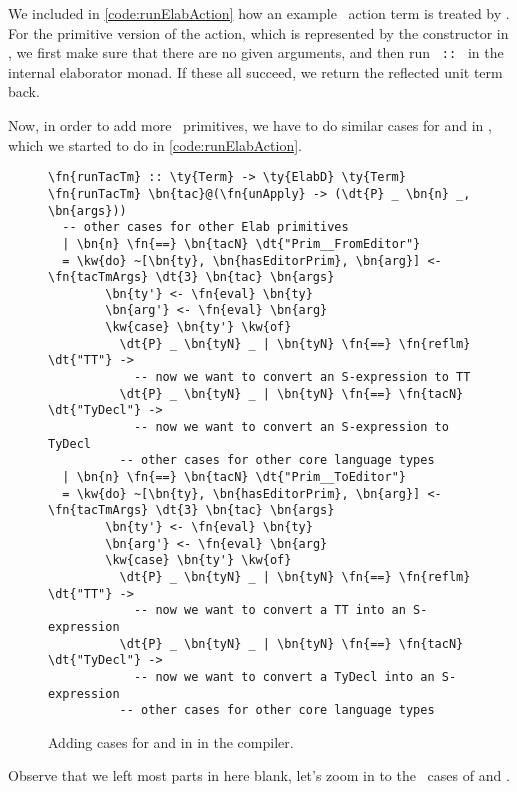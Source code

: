 We included in \autoref{code:runElabAction} how an example \Elab\ action
term is treated by . For the primitive version of the 
action, which is represented by the  constructor in \Elab,
we first make sure that there are no given arguments, and then run
\texttt{ ::   \ty{()}} in the internal elaborator
monad. If these all succeed, we return the reflected unit term back.

Now, in order to add more \Elab\ primitives, we have to do similar cases for
 and  in , which we
started to do in \autoref{code:runElabAction}.

\begin{figure}[ht]
\caption{Adding cases for  and  in  in the compiler.}
\label{code:runElabAction}
\begin{Verbatim}[framesep=2mm, label=\footnotesize{\normalfont{Haskell}}, labelposition=topline]
\fn{runTacTm} :: \ty{Term} -> \ty{ElabD} \ty{Term}
\fn{runTacTm} \bn{tac}@(\fn{unApply} -> (\dt{P} _ \bn{n} _, \bn{args}))
  -- other cases for other Elab primitives
  | \bn{n} \fn{==} \bn{tacN} \dt{"Prim__FromEditor"}
  = \kw{do} ~[\bn{ty}, \bn{hasEditorPrim}, \bn{arg}] <- \fn{tacTmArgs} \dt{3} \bn{tac} \bn{args}
        \bn{ty'} <- \fn{eval} \bn{ty}
        \bn{arg'} <- \fn{eval} \bn{arg}
        \kw{case} \bn{ty'} \kw{of}
          \dt{P} _ \bn{tyN} _ | \bn{tyN} \fn{==} \fn{reflm} \dt{"TT"} ->
            -- now we want to convert an S-expression to TT
          \dt{P} _ \bn{tyN} _ | \bn{tyN} \fn{==} \fn{tacN} \dt{"TyDecl"} ->
            -- now we want to convert an S-expression to TyDecl
          -- other cases for other core language types
  | \bn{n} \fn{==} \bn{tacN} \dt{"Prim__ToEditor"}
  = \kw{do} ~[\bn{ty}, \bn{hasEditorPrim}, \bn{arg}] <- \fn{tacTmArgs} \dt{3} \bn{tac} \bn{args}
        \bn{ty'} <- \fn{eval} \bn{ty}
        \bn{arg'} <- \fn{eval} \bn{arg}
        \kw{case} \bn{ty'} \kw{of}
          \dt{P} _ \bn{tyN} _ | \bn{tyN} \fn{==} \fn{reflm} \dt{"TT"} ->
            -- now we want to convert a TT into an S-expression
          \dt{P} _ \bn{tyN} _ | \bn{tyN} \fn{==} \fn{tacN} \dt{"TyDecl"} ->
            -- now we want to convert a TyDecl into an S-expression
          -- other cases for other core language types
\end{Verbatim}
\end{figure}

Observe that we left most parts in here blank, let's zoom in to the \TT\ cases
  of  and .

